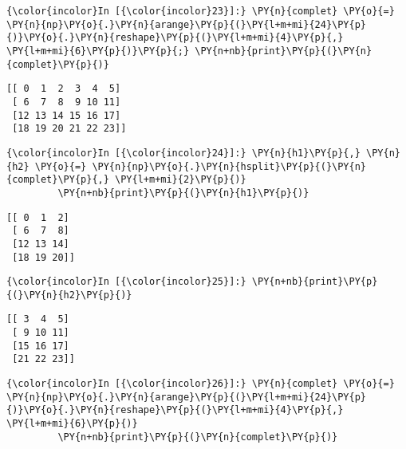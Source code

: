     \begin{Verbatim}[commandchars=\\\{\},frame=single,framerule=0.3mm,rulecolor=\color{cellframecolor}]
{\color{incolor}In [{\color{incolor}23}]:} \PY{n}{complet} \PY{o}{=} \PY{n}{np}\PY{o}{.}\PY{n}{arange}\PY{p}{(}\PY{l+m+mi}{24}\PY{p}{)}\PY{o}{.}\PY{n}{reshape}\PY{p}{(}\PY{l+m+mi}{4}\PY{p}{,} \PY{l+m+mi}{6}\PY{p}{)}\PY{p}{;} \PY{n+nb}{print}\PY{p}{(}\PY{n}{complet}\PY{p}{)}
\end{Verbatim}


    \begin{Verbatim}[commandchars=\\\{\},frame=single,framerule=0.3mm,rulecolor=\color{cellframecolor}]
[[ 0  1  2  3  4  5]
 [ 6  7  8  9 10 11]
 [12 13 14 15 16 17]
 [18 19 20 21 22 23]]
\end{Verbatim}

    \begin{Verbatim}[commandchars=\\\{\},frame=single,framerule=0.3mm,rulecolor=\color{cellframecolor}]
{\color{incolor}In [{\color{incolor}24}]:} \PY{n}{h1}\PY{p}{,} \PY{n}{h2} \PY{o}{=} \PY{n}{np}\PY{o}{.}\PY{n}{hsplit}\PY{p}{(}\PY{n}{complet}\PY{p}{,} \PY{l+m+mi}{2}\PY{p}{)}
         \PY{n+nb}{print}\PY{p}{(}\PY{n}{h1}\PY{p}{)}
\end{Verbatim}


    \begin{Verbatim}[commandchars=\\\{\},frame=single,framerule=0.3mm,rulecolor=\color{cellframecolor}]
[[ 0  1  2]
 [ 6  7  8]
 [12 13 14]
 [18 19 20]]
\end{Verbatim}

    \begin{Verbatim}[commandchars=\\\{\},frame=single,framerule=0.3mm,rulecolor=\color{cellframecolor}]
{\color{incolor}In [{\color{incolor}25}]:} \PY{n+nb}{print}\PY{p}{(}\PY{n}{h2}\PY{p}{)}
\end{Verbatim}


    \begin{Verbatim}[commandchars=\\\{\},frame=single,framerule=0.3mm,rulecolor=\color{cellframecolor}]
[[ 3  4  5]
 [ 9 10 11]
 [15 16 17]
 [21 22 23]]
\end{Verbatim}

    \begin{Verbatim}[commandchars=\\\{\},frame=single,framerule=0.3mm,rulecolor=\color{cellframecolor}]
{\color{incolor}In [{\color{incolor}26}]:} \PY{n}{complet} \PY{o}{=} \PY{n}{np}\PY{o}{.}\PY{n}{arange}\PY{p}{(}\PY{l+m+mi}{24}\PY{p}{)}\PY{o}{.}\PY{n}{reshape}\PY{p}{(}\PY{l+m+mi}{4}\PY{p}{,} \PY{l+m+mi}{6}\PY{p}{)}
         \PY{n+nb}{print}\PY{p}{(}\PY{n}{complet}\PY{p}{)}
\end{Verbatim}


